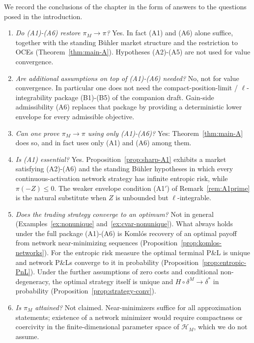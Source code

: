 \documentclass[11pt,a4paper]{report}
\numberwithin{equation}{chapter}
\theoremstyle{plain}
\theoremstyle{definition}
\newcommand{\HH}{\mathcal{H}}
\begin{document}
We record the conclusions of the chapter in the form of answers to the questions posed in the introduction.

\begin{enumerate}[leftmargin=*,itemsep=1ex,parsep=0pt]
    \item \emph{Do (A1)-(A6) restore $\pi_M\to\pi$?} Yes. In fact (A1) and (A6) alone suffice, together with the standing B\"uhler market structure and the restriction to OCEs (Theorem~\ref{thm:main-A}). Hypotheses (A2)-(A5) are not used for value convergence.
    \item \emph{Are additional assumptions on top of (A1)-(A6) needed?} No, not for value convergence. In particular one does not need the compact-position-limit / $\ell$-integrability package (B1)-(B5) of the companion draft. Gain-side admissibility (A6) replaces that package by providing a deterministic lower envelope for every admissible objective.
    \item \emph{Can one prove $\pi_M\to\pi$ using only (A1)-(A6)?} Yes: Theorem~\ref{thm:main-A} does so, and in fact uses only (A1) and (A6) among them.
    \item \emph{Is (A1) essential?} Yes. Proposition~\ref{prop:sharp-A1} exhibits a market satisfying (A2)-(A6) and the standing B\"uhler hypotheses in which every continuous-activation network strategy has infinite entropic risk, while $\pi(-Z)\le0$. The weaker envelope condition (A1$'$) of Remark~\ref{rem:A1prime} is the natural substitute when $Z$ is unbounded but $\ell$-integrable.
    \item \emph{Does the trading strategy converge to an optimum?} Not in general (Examples~\ref{ex:nonunique} and~\ref{ex:cvar-nonunique}). What always holds under the full package (A1)-(A6) is Koml\'os recovery of an optimal payoff from network near-minimizing sequences (Proposition~\ref{prop:komlos-networks}). For the entropic risk measure the optimal terminal P\&L is unique and network P\&Ls converge to it in probability (Proposition~\ref{prop:entropic-PnL}). Under the further assumptions of zero costs and conditional non-degeneracy, the optimal strategy itself is unique and $H\circ\delta^M\to\delta^*$ in probability (Proposition~\ref{prop:strategy-conv}).
    \item \emph{Is $\pi_M$ attained?} Not claimed. Near-minimizers suffice for all approximation statements; existence of a network minimizer would require compactness or coercivity in the finite-dimensional parameter space of $\HH_M$, which we do not assume.
\end{enumerate}
\end{document}
